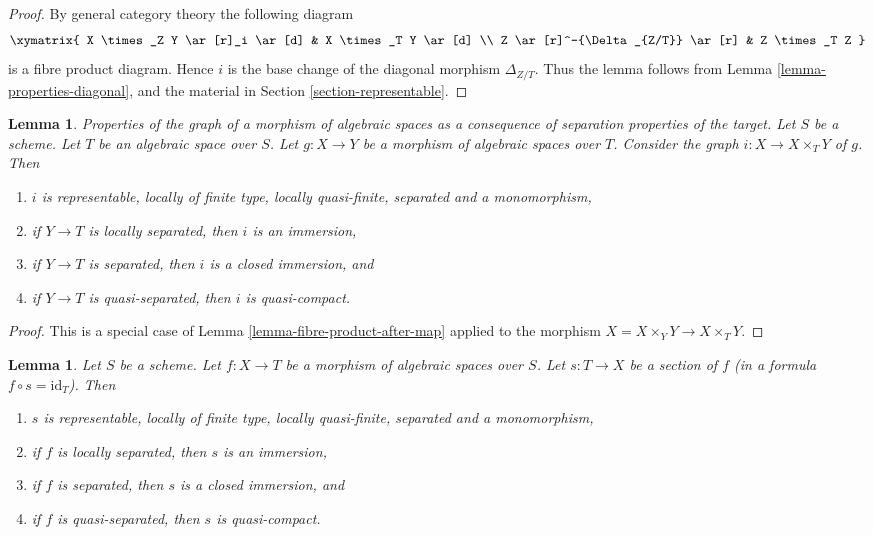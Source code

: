 \documentclass{stacks-project}
\newenvironment{slogan}{\comment}{\endcomment}
\theoremstyle{plain}
\newtheorem{lemma}[subsection]{Lemma}
\theoremstyle{definition}
\theoremstyle{remark}
\numberwithin{equation}{subsection}
\begin{document}
\begin{proof}
By general category theory the following diagram
$$
\xymatrix{
X \times_Z Y \ar[r]_i \ar[d] & X \times_T Y \ar[d] \\
Z \ar[r]^-{\Delta_{Z/T}} \ar[r] & Z \times_T Z
}
$$
is a fibre product diagram. Hence $i$ is the base change of the
diagonal morphism $\Delta_{Z/T}$. Thus the lemma follows
from Lemma \ref{lemma-properties-diagonal}, and the material in
Section \ref{section-representable}.
\end{proof}

\begin{lemma}
\label{lemma-semi-diagonal}
\begin{slogan}
Properties of the graph of a morphism of algebraic spaces
as a consequence of separation properties of the target.
\end{slogan}
Let $S$ be a scheme. Let $T$ be an algebraic space over $S$.
Let $g : X \to Y$ be a morphism of algebraic spaces over $T$.
Consider the graph $i : X \to X \times_T Y$ of $g$. Then
\begin{enumerate}
\item $i$ is representable, locally of finite type, locally quasi-finite,
separated and a monomorphism,
\item if $Y \to T$ is locally separated, then $i$ is an immersion,
\item if $Y \to T$ is separated, then $i$ is a closed immersion, and
\item if $Y \to T$ is quasi-separated, then $i$ is quasi-compact.
\end{enumerate}
\end{lemma}

\begin{proof}
This is a special case of Lemma \ref{lemma-fibre-product-after-map}
applied to the morphism $X = X \times_Y Y \to X \times_T Y$.
\end{proof}

\begin{lemma}
\label{lemma-section-immersion}
Let $S$ be a scheme.
Let $f : X \to T$ be a morphism of algebraic spaces over $S$.
Let $s : T \to X$ be a section of $f$ (in a formula
$f \circ s = \text{id}_T$). Then
\begin{enumerate}
\item $s$ is representable, locally of finite type, locally quasi-finite,
separated and a monomorphism,
\item if $f$ is locally separated, then $s$ is an immersion,
\item if $f$ is separated, then $s$ is a closed immersion, and
\item if $f$ is quasi-separated, then $s$ is quasi-compact.
\end{enumerate}
\end{lemma}
\end{document}
